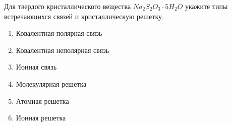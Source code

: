 
Для твердого
кристаллического вещества $Na_2S_2O_3 \cdot 5H_2O$ укажите типы встречающихся связей и
кристаллическую решетку.

\begin{enumerate}
    \item Ковалентная полярная связь
    \item Ковалентная неполярная связь
    \item Ионная связь
    \item Молекулярная решетка
    \item Атомная решетка
    \item Ионная решетка
\end{enumerate}



